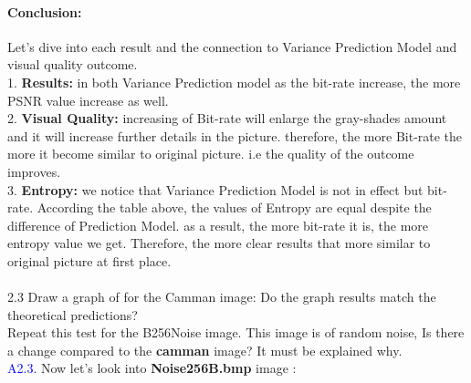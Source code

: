 \documentclass[letterpaper, 12pt]{article}
\begin{document}
\paragraph{Conclusion:} Let's dive into each result and the connection to Variance Prediction Model and visual quality outcome. \\ 
1. \textbf{Results:} in both Variance Prediction model as the bit-rate increase, the more PSNR value increase as well.\\
2. \textbf{Visual Quality:} increasing of Bit-rate will enlarge the gray-shades amount and it will increase further details in the picture. therefore, the more Bit-rate the more it become similar to original picture. i.e the quality of the outcome improves.\\
3. \textbf{Entropy:} we notice that Variance Prediction Model is not in effect but bit-rate. According the table above, the values of Entropy are equal despite the difference of Prediction Model. as a result, the more bit-rate it is, the more entropy value we get. Therefore, the more clear results that more similar to original picture at first place.\\ \\
2.3 Draw a graph of   for the Camman image:
Do the graph results match the theoretical predictions? \\
Repeat this test for the B256Noise image. This image is of random noise,
Is there a change compared to the \textbf{camman} image? It must be explained why. \\
\textcolor{blue}{A2.3. }Now let's look into \textbf{Noise256B.bmp} image : 
\end{document}
